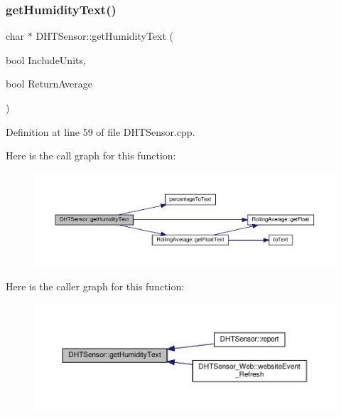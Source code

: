 \subsubsection{\texorpdfstring{get\+Humidity\+Text()}{getHumidityText()}\hspace{0.1cm}{\footnotesize\ttfamily [1/2]}}
{\footnotesize\ttfamily char $\ast$ D\+H\+T\+Sensor\+::get\+Humidity\+Text (\begin{DoxyParamCaption}\item[{bool}]{Include\+Units,  }\item[{bool}]{Return\+Average }\end{DoxyParamCaption})}



Definition at line 59 of file D\+H\+T\+Sensor.\+cpp.

Here is the call graph for this function\+:
\nopagebreak
\begin{figure}[H]
\begin{center}
\leavevmode
\includegraphics[width=350pt]{class_d_h_t_sensor_a795e7b88ea1b141213f7781d40cca458_cgraph}
\end{center}
\end{figure}
Here is the caller graph for this function\+:
\nopagebreak
\begin{figure}[H]
\begin{center}
\leavevmode
\includegraphics[width=350pt]{class_d_h_t_sensor_a795e7b88ea1b141213f7781d40cca458_icgraph}
\end{center}
\end{figure}
\mbox{\label{class_d_h_t_sensor_a20d8ef72e8d9fdbd6c6747cfd70f8fa2}} 
